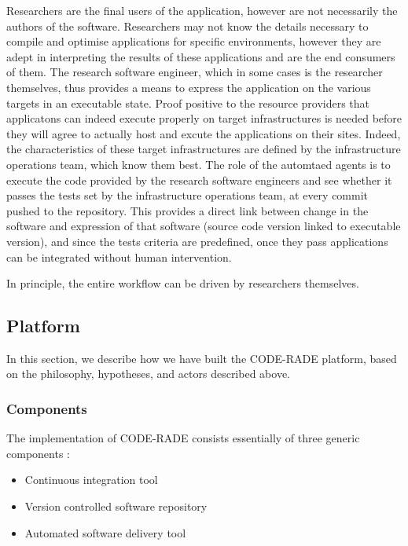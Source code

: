\documentclass[a4paper]{jpconf}
\begin{document}
Researchers are the final users of the application, however are not necessarily the authors of the software. Researchers may not know the details necessary to compile and optimise applications for specific environments, however they are adept in interpreting the results of these applications and are the end consumers of them. The research software engineer, which in some cases is the researcher themselves, thus provides a means to express the application on the various targets in an executable state. Proof positive to the resource providers that applicatons can indeed execute properly on target infrastructures is needed before they will agree to actually host and excute the applications on their sites. Indeed, the characteristics of these target infrastructures are defined by the infrastructure operations team, which know them best. The role of the automtaed agents is to execute the code provided by the research software engineers and see whether it passes the tests set by the infrastructure operations team, at every commit pushed to the repository. This provides a direct link between change in the software and expression of that software (source code version linked to executable version), and since the tests criteria are predefined, once they pass applications can be integrated without human intervention.

In principle, the entire workflow can be driven by researchers themselves.

\subsection{Platform}

In this section, we describe how we have built the CODE-RADE platform, based on the philosophy, hypotheses, and actors described above.

\subsubsection{Components}

The implementation of CODE-RADE consists essentially of three generic components :

\begin{itemize}
	\item Continuous integration tool
  \item Version controlled software repository
  \item Automated software delivery tool
\end{itemize}
\end{document}
